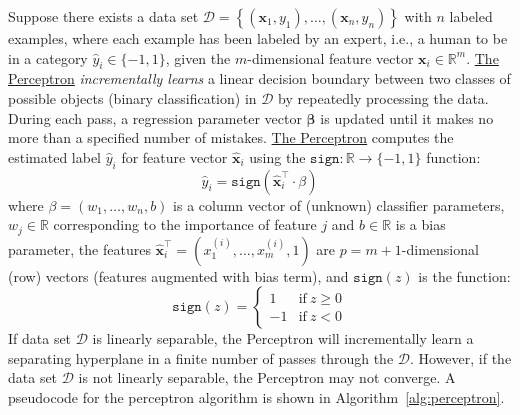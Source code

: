 \documentclass{article}[11pt]
\begin{document}
Suppose there exists a data set
$\mathcal{D} = \left\{(\mathbf{x}_{1},y_{1}),\dotsc,(\mathbf{x}_{n},y_{n})\right\}$ with $n$ labeled examples, where each example has been labeled by an expert, i.e., a human to be in a category $\hat{y}_{i}\in\{-1,1\}$, given the $m$-dimensional feature vector $\mathbf{x}_{i}\in\mathbb{R}^{m}$.  
\href{https://en.wikipedia.org/wiki/Perceptron}{The Perceptron} \textit{incrementally learns} a linear decision boundary between two classes of possible objects (binary classification) in $\mathcal{D}$ by repeatedly processing the data. 
During each pass, a regression parameter vector $\mathbf{\beta}$ is updated until it makes no more than a specified number of mistakes. 
\href{https://en.wikipedia.org/wiki/Perceptron}{The Perceptron} computes the estimated label $\hat{y}_{i}$ for feature vector $\hat{\mathbf{x}}_{i}$ using the $\texttt{sign}:\mathbb{R}\to\{-1,1\}$ function:
\begin{equation*}
    \hat{y}_{i} = \texttt{sign}\left(\hat{\mathbf{x}}_{i}^{\top}\cdot\beta\right)
\end{equation*}
where $\beta=\left(w_{1},\dots,w_{n}, b\right)$ is a column vector of (unknown) classifier parameters, 
$w_{j}\in\mathbb{R}$ corresponding to the importance of feature $j$ and $b\in\mathbb{R}$ is a bias parameter, 
the features $\hat{\mathbf{x}}^{\top}_{i}=\left(x^{(i)}_{1},\dots,x^{(i)}_{m}, 1\right)$ are $p = m+1$-dimensional (row) vectors 
(features augmented with bias term), and $\texttt{sign}(z)$ is the function:
\begin{equation*}
    \texttt{sign}(z) = 
    \begin{cases}
        1 & \text{if}~z\geq{0}\\
        -1 & \text{if}~z<0
    \end{cases}
\end{equation*}
If data set $\mathcal{D}$ is linearly separable, the Perceptron will incrementally learn a separating hyperplane in a finite number of passes through the $\mathcal{D}$. 
However, if the data set $\mathcal{D}$ is not linearly separable, the Perceptron may not converge. 
A pseudocode for the perceptron algorithm is shown in Algorithm~\ref{alg:perceptron}.
\end{document}
